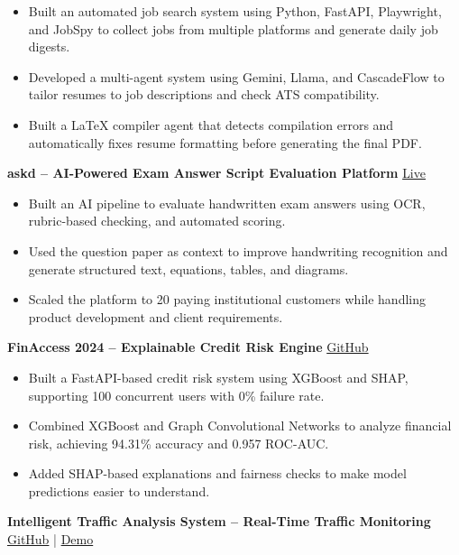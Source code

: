 \documentclass[10pt,a4paper]{article}
\begin{document}
\begin{itemize}
    \item Built an automated job search system using Python, FastAPI, Playwright, and JobSpy to collect jobs from multiple platforms and generate daily job digests.
    \item Developed a multi-agent system using Gemini, Llama, and CascadeFlow to tailor resumes to job descriptions and check ATS compatibility.
    \item Built a LaTeX compiler agent that detects compilation errors and automatically fixes resume formatting before generating the final PDF.
\end{itemize}

\textbf{askd -- AI-Powered Exam Answer Script Evaluation Platform}
\hfill
\href{https://www.askd.in/}{Live}

\begin{itemize}
    \item Built an AI pipeline to evaluate handwritten exam answers using OCR, rubric-based checking, and automated scoring.
    \item Used the question paper as context to improve handwriting recognition and generate structured text, equations, tables, and diagrams.
    \item Scaled the platform to 20 paying institutional customers while handling product development and client requirements.
\end{itemize}

\textbf{FinAccess 2024 -- Explainable Credit Risk Engine}
\hfill
\href{https://github.com/peddusreekanthreddy7/fin_access}{GitHub}

\begin{itemize}
    \item Built a FastAPI-based credit risk system using XGBoost and SHAP, supporting 100 concurrent users with 0\% failure rate.
    \item Combined XGBoost and Graph Convolutional Networks to analyze financial risk, achieving 94.31\% accuracy and 0.957 ROC-AUC.
    \item Added SHAP-based explanations and fairness checks to make model predictions easier to understand.
\end{itemize}

\textbf{Intelligent Traffic Analysis System -- Real-Time Traffic Monitoring}
\hfill
\href{https://github.com/peddusreekanthreddy7/traffic-analysis-}{GitHub}
\;|\;
\href{https://youtu.be/JzggnaPxmZU?si=NOQ2H9EeKv0WUNBY}{Demo}
\end{document}
